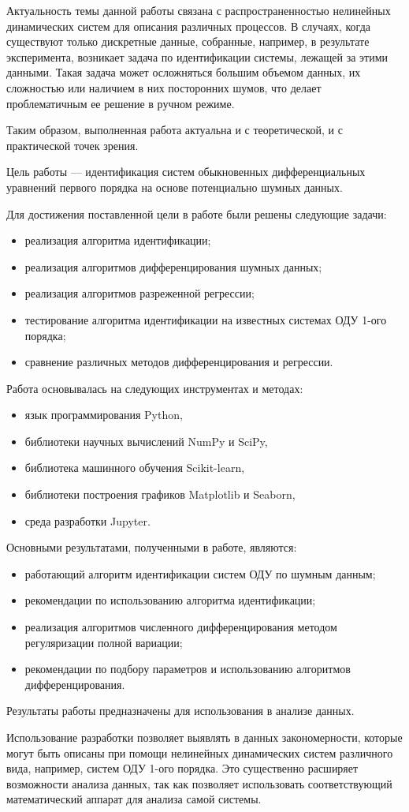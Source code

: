 \introduction

Актуальность темы данной работы связана с распространенностью нелинейных динамических систем для описания различных процессов. В случаях, когда существуют только дискретные данные, собранные, например, в результате эксперимента, возникает задача по идентификации системы, лежащей за этими данными. Такая задача может осложняться большим объемом данных, их сложностью или наличием в них посторонних шумов, что делает проблематичным ее решение в ручном режиме.

Таким образом, выполненная работа актуальна и с теоретической, и с практической точек зрения.

Цель работы --– идентификация систем обыкновенных дифференциальных уравнений первого порядка на основе потенциально шумных данных.

Для достижения поставленной цели в работе были решены следующие задачи:
\begin{itemize}
  \item реализация алгоритма идентификации;
  \item реализация алгоритмов дифференцирования шумных данных;
  \item реализация алгоритмов разреженной регрессии;
  \item тестирование алгоритма идентификации на известных системах ОДУ 1-ого порядка;
  \item сравнение различных методов дифференцирования и регрессии.
\end{itemize}

Работа основывалась на следующих инструментах и методах:
\begin{itemize}
  \item язык программирования Python,
  \item библиотеки научных вычислений NumPy и SciPy,
  \item библиотека машинного обучения Scikit-learn,
  \item библиотеки построения графиков Matplotlib и Seaborn,
  \item среда разработки Jupyter.
\end{itemize}

Основными результатами, полученными в работе, являются:
\begin{itemize}
\item работающий алгоритм идентификации систем ОДУ по шумным данным;
\item рекомендации по использованию алгоритма идентификации;
\item реализация алгоритмов численного дифференцирования методом регуляризации полной вариации;
\item рекомендации по подбору параметров и использованию алгоритмов дифференцирования.
\end{itemize}

Результаты работы предназначены для использования в анализе данных.

Использование разработки позволяет выявлять в данных закономерности, которые могут быть описаны при помощи нелинейных динамических систем различного вида, например, систем ОДУ 1-ого порядка. Это существенно расширяет возможности анализа данных, так как позволяет использовать соответствующий математический аппарат для анализа самой системы.
